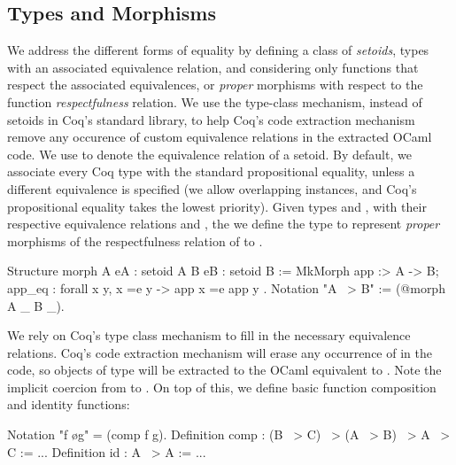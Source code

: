 \documentclass[ a4paper, UKenglish, cleveref, autoref, thm-restate]{lipics-v2021}
\begin{document}
\subsection{Types and Morphisms}
\label{sec:types-morphisms}
We address the different forms of equality by defining a class of
\emph{setoids}, types with an associated equivalence relation, and considering
only functions that respect the associated equivalences, or \emph{proper}
morphisms with respect to the function \emph{respectfulness} relation. We use
the type-class mechanism, instead of setoids in Coq's standard library, to help
Coq's code extraction mechanism remove any occurence of custom equivalence
relations in the extracted OCaml code. We use  to denote the equivalence
relation of a setoid. By default, we associate every Coq type with the standard
propositional equality, unless a different equivalence is specified (we allow
overlapping instances, and Coq's propositional equality takes the lowest
priority).
Given types  and  , with their respective
equivalence relations  and
, the we define the type
 to represent \emph{proper} morphisms of the
respectfulness relation of  to .
\begin{coqcode}
Structure morph A {eA : setoid A} B {eB : setoid B} :=
  MkMorph { app :> A -> B; app_eq : forall x y, x =e y -> app x =e app y }.
Notation "A ~> B" := (@morph A _ B _).
\end{coqcode}
We rely on Coq's type class mechanism to fill in the necessary equivalence
relations. Coq's code extraction mechanism will erase any occurrence
of  in the code, so objects of type  will be extracted to
the OCaml equivalent to . Note the implicit coercion
from  to .
On top of this, we define basic function composition and identity functions:
\begin{coqcode}
Notation "f \o g" = (comp f g).
Definition comp : (B ~> C) ~> (A ~> B) ~> A ~> C := ...
Definition id : A ~> A := ...
\end{coqcode}
\end{document}
